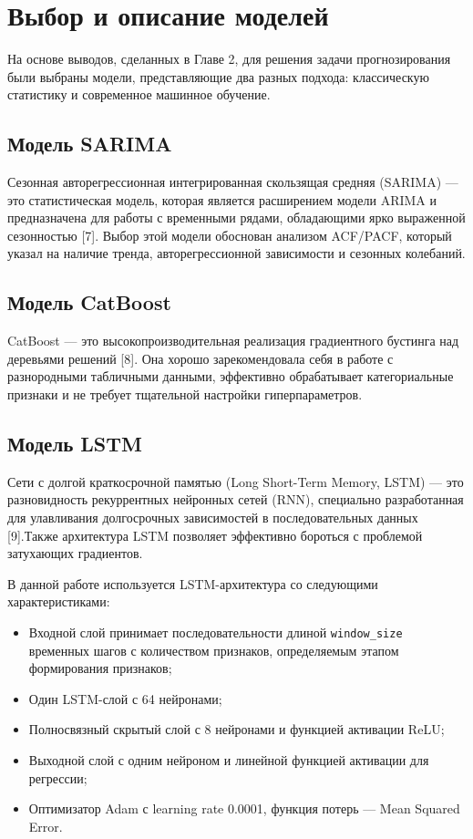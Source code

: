 \section{Выбор и описание моделей}
\label{sec:model_selection}

\hspace*{1.25cm}На основе выводов, сделанных в Главе 2, для решения задачи прогнозирования были выбраны модели, представляющие два разных подхода: классическую статистику и современное машинное обучение.

\subsection{Модель SARIMA}
\hspace*{1.25cm}Сезонная авторегрессионная интегрированная скользящая средняя (SARIMA) — это статистическая модель, которая является расширением модели ARIMA и предназначена для работы с временными рядами, обладающими ярко выраженной сезонностью [7]. Выбор этой модели обоснован анализом ACF/PACF, который указал на наличие тренда, авторегрессионной зависимости и сезонных колебаний.

\subsection{Модель CatBoost}
\hspace*{1.25cm}CatBoost — это высокопроизводительная реализация градиентного бустинга над деревьями решений [8]. Она хорошо зарекомендовала себя в работе с разнородными табличными данными, эффективно обрабатывает категориальные признаки и не требует тщательной настройки гиперпараметров.

\subsection{Модель LSTM}
\hspace*{1.25cm}Сети с долгой краткосрочной памятью (Long Short-Term Memory, LSTM) — это разновидность рекуррентных нейронных сетей (RNN), специально разработанная для улавливания долгосрочных зависимостей в последовательных данных [9].Также архитектура LSTM позволяет эффективно бороться с проблемой затухающих градиентов.

\hspace*{1.25cm}В данной работе используется LSTM-архитектура со следующими характеристиками:
\begin{itemize}
	\item Входной слой принимает последовательности длиной \texttt{window\_size} временных шагов с количеством признаков, определяемым этапом формирования признаков;
	\item Один LSTM-слой с 64 нейронами;
	\item Полносвязный скрытый слой с 8 нейронами и функцией активации ReLU;
	\item Выходной слой с одним нейроном и линейной функцией активации для регрессии;
	\item Оптимизатор Adam с learning rate 0.0001, функция потерь --- Mean Squared Error.
\end{itemize}

